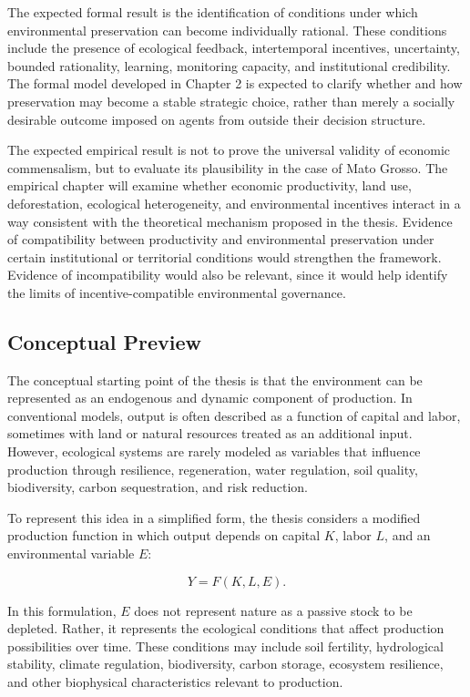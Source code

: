 The expected formal result is the identification of conditions under which environmental preservation can become individually rational. These conditions include the presence of ecological feedback, intertemporal incentives, uncertainty, bounded rationality, learning, monitoring capacity, and institutional credibility. The formal model developed in Chapter 2 is expected to clarify whether and how preservation may become a stable strategic choice, rather than merely a socially desirable outcome imposed on agents from outside their decision structure.

The expected empirical result is not to prove the universal validity of economic commensalism, but to evaluate its plausibility in the case of Mato Grosso. The empirical chapter will examine whether economic productivity, land use, deforestation, ecological heterogeneity, and environmental incentives interact in a way consistent with the theoretical mechanism proposed in the thesis. Evidence of compatibility between productivity and environmental preservation under certain institutional or territorial conditions would strengthen the framework. Evidence of incompatibility would also be relevant, since it would help identify the limits of incentive-compatible environmental governance.

\subsection{Conceptual Preview}

The conceptual starting point of the thesis is that the environment can be represented as an endogenous and dynamic component of production. In conventional models, output is often described as a function of capital and labor, sometimes with land or natural resources treated as an additional input. However, ecological systems are rarely modeled as variables that influence production through resilience, regeneration, water regulation, soil quality, biodiversity, carbon sequestration, and risk reduction.

To represent this idea in a simplified form, the thesis considers a modified production function in which output depends on capital \(K\), labor \(L\), and an environmental variable \(E\):

\[
Y = F(K,L,E).
\]

In this formulation, \(E\) does not represent nature as a passive stock to be depleted. Rather, it represents the ecological conditions that affect production possibilities over time. These conditions may include soil fertility, hydrological stability, climate regulation, biodiversity, carbon storage, ecosystem resilience, and other biophysical characteristics relevant to production.

